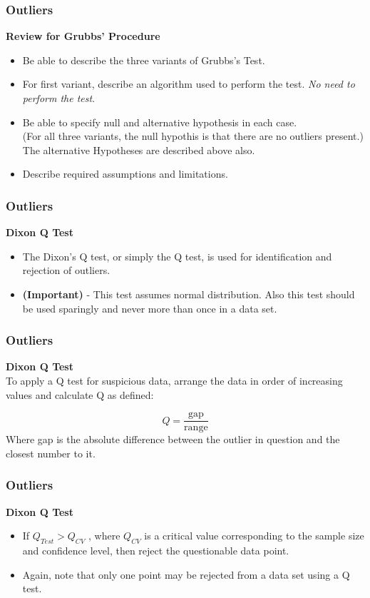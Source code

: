 \documentclass{beamer}
\begin{document}
\begin{frame}[fragile]
	\frametitle{Outliers}
	\Large
\textbf{Review for Grubbs' Procedure}
\begin{itemize}
\item Be able to describe the three variants of Grubbs's Test.
\item For first variant, describe an algorithm used to perform the test. \textit{No need to perform the test}.
\item Be able to specify null and alternative hypothesis in each case.\\ (For all three variants, the null hypothis is that there are no outliers present.) \\ The alternative Hypotheses are described above also.
\item Describe required assumptions and limitations.
\end{itemize}
\end{frame}
\begin{frame}[fragile]
	\frametitle{Outliers}
	\Large
	\textbf{Dixon Q Test}\\
	\begin{itemize}
	\item The Dixon's Q test, or simply the Q test, is used for identification and rejection of outliers. 
	\item \textbf{(Important)} - This test assumes normal distribution. Also this test should be used sparingly and never more than once in a data set. 
\end{itemize}
	
\end{frame}
\begin{frame}[fragile]
	\frametitle{Outliers}
	\Large
	\textbf{Dixon Q Test}\\
	To apply a Q test for suspicious data, arrange the data in order of increasing values and calculate Q as defined:
	
	\[ Q = \frac{\text{gap}}{\text{range}} \]
	Where gap is the absolute difference between the outlier in question and the closest number to it. 
\end{frame}
\begin{frame}[fragile]
	\frametitle{Outliers}
	\Large
	\textbf{Dixon Q Test}
	\begin{itemize}
\item 	If $Q_{Test} > Q_{CV}$ , where $Q_{CV}$ is a critical value corresponding to the sample size and confidence level, then reject the questionable data point. 
\item Again, note that only one point may be rejected from a data set using a Q test.
	\end{itemize}
	
	
\end{frame}
\end{document}
